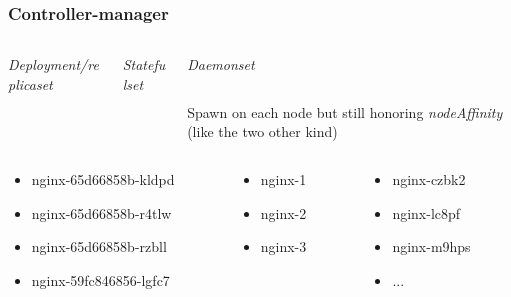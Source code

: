 \documentclass{beamer}
\begin{document}
\begin{frame}
\begin{center}
  \end{center}
\end{frame}

\begin{frame}
  \frametitle{Controller-manager}
  \begin{columns}
  \begin{column}{0.3\textwidth}
    \textit{Deployment/replicaset}
    \inputminted[fontsize=\tiny,frame=single]{yaml}{resources/deployment.yaml}
  \end{column}
  \begin{column}{0.39\textwidth}
    \textit{Statefulset}
    \inputminted[fontsize=\tiny,frame=single]{yaml}{resources/statefulset.yaml}
  \end{column}
  \begin{column}{0.3\textwidth}
    \textit{Daemonset}
    \inputminted[fontsize=\tiny,frame=single]{yaml}{resources/daemonset.yaml}
    \scriptsize{
      Spawn on each node but still honoring \textit{nodeAffinity} (like the two other kind)
    }
  \end{column}
  \end{columns}
  \begin{columns}
  \begin{column}{0.4\textwidth}
    \scriptsize{
      \begin{itemize}
        \item nginx-65d66858b-kldpd
        \item nginx-65d66858b-r4tlw
        \item nginx-65d66858b-rzbll
        \item nginx-59fc846856-lgfc7
      \end{itemize}
    }
  \end{column}
  \begin{column}{0.3\textwidth}
    \scriptsize{
      \begin{itemize}
        \item nginx-1
        \item nginx-2
        \item nginx-3
      \end{itemize}
    }
  \end{column}
  \begin{column}{0.3\textwidth}
    \scriptsize{
      \begin{itemize}
        \item nginx-czbk2
        \item nginx-lc8pf
        \item nginx-m9hps
        \item ...
      \end{itemize}
    }
  \end{column}
  \end{columns}


\end{frame}
\end{document}
